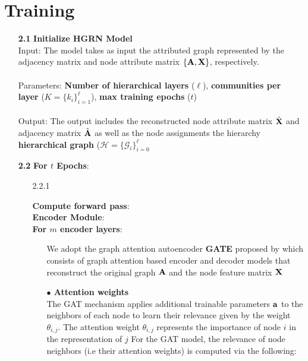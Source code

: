 \documentclass[a4paper,12pt]{article}
\newcommand{\forceindent}{\leavevmode{\parindent=2em\indent}}
\begin{document}
	\section{Training}
	\begin{itemize}
	\item[\bf 2.1]{\textbf{Initialize HGRN Model} \\
		Input: The model takes as input the attributed graph represented by the adjacency matrix and node attribute matrix $\{{\bf A}, {\bf X}\}$, respectively. \\
		\\
		Parameters: \textbf{Number of hierarchical layers} ($\ell$), \textbf{communities per layer} ($K =\{k_i\}_{i=1}^\ell$), \textbf{max training epochs} ($t$) \\
		\\
		Output: The output includes the reconstructed node attribute matrix $\hat{\bf X}$ and adjacency matrix $\hat{\bf A}$ as well as the node assignments the hierarchy \textbf{hierarchical graph} ($\mathcal{H} = \{\mathcal{G}_i\}_{i = 0}^\ell$
	}

	\item[\bf 2.2]{\textbf{For $t$ Epochs}:}
		\begin{enumerate}
			\item[2.2.1]{\textbf{Compute forward pass}: \\
			
			 \forceindent \textbf{Encoder Module}: \\
			 \forceindent \textbf{For $m$ encoder layers}: 
			\begin{enumerate}
				\item[]{We adopt the graph attention autoencoder \textbf{GATE} proposed by \cite{salehi2019graph} which consists of graph attention based encoder and decoder models that reconstruct the original graph ${\bf A}$ and the node feature matrix $\bf{X}$}
				\item[]{\textbf{$\bullet$ Attention weights} \\
					The GAT mechanism applies additional trainable parameters ${\bf a}$ to the neighbors of each node to learn their relevance given by the weight $\theta_{i,j}$. The attention weight $\theta_{i,j}$ represents the importance of node $i$ in the representation of $j$ For the GAT model, the relevance of node neighbors (i.e their attention weights) is computed via the following:
					
}
\end{enumerate}}
\end{enumerate}
\end{itemize}
\end{document}
